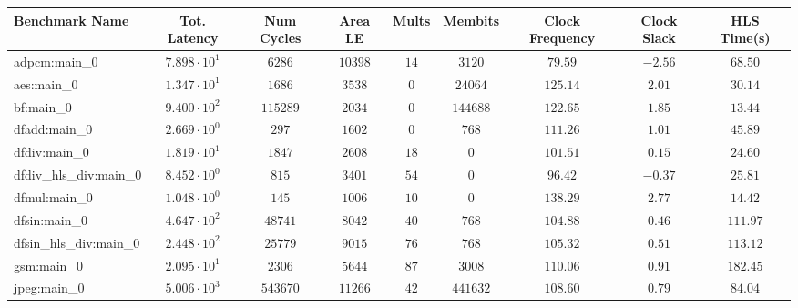 \begin{tabular}{|l|c|c|c|c|c|c|c|c|}
\hline
Benchmark Name          & Tot. Latency           & Num Cycles & Area LE   & Mults   & Membits    & Clock Frequency & Clock Slack & HLS Time(s) \\
\hline
adpcm:main\_0           & $ 7.898 \cdot 10^{1} $ & $ 6286   $ & $ 10398 $ & $ 14  $ & $ 3120   $ & $ 79.59       $ & $ -2.56   $ & $ 68.50   $ \\
aes:main\_0             & $ 1.347 \cdot 10^{1} $ & $ 1686   $ & $ 3538  $ & $ 0   $ & $ 24064  $ & $ 125.14      $ & $ 2.01    $ & $ 30.14   $ \\
bf:main\_0              & $ 9.400 \cdot 10^{2} $ & $ 115289 $ & $ 2034  $ & $ 0   $ & $ 144688 $ & $ 122.65      $ & $ 1.85    $ & $ 13.44   $ \\
dfadd:main\_0           & $ 2.669 \cdot 10^{0} $ & $ 297    $ & $ 1602  $ & $ 0   $ & $ 768    $ & $ 111.26      $ & $ 1.01    $ & $ 45.89   $ \\
dfdiv:main\_0           & $ 1.819 \cdot 10^{1} $ & $ 1847   $ & $ 2608  $ & $ 18  $ & $ 0      $ & $ 101.51      $ & $ 0.15    $ & $ 24.60   $ \\
dfdiv\_hls\_div:main\_0 & $ 8.452 \cdot 10^{0} $ & $ 815    $ & $ 3401  $ & $ 54  $ & $ 0      $ & $ 96.42       $ & $ -0.37   $ & $ 25.81   $ \\
dfmul:main\_0           & $ 1.048 \cdot 10^{0} $ & $ 145    $ & $ 1006  $ & $ 10  $ & $ 0      $ & $ 138.29      $ & $ 2.77    $ & $ 14.42   $ \\
dfsin:main\_0           & $ 4.647 \cdot 10^{2} $ & $ 48741  $ & $ 8042  $ & $ 40  $ & $ 768    $ & $ 104.88      $ & $ 0.46    $ & $ 111.97  $ \\
dfsin\_hls\_div:main\_0 & $ 2.448 \cdot 10^{2} $ & $ 25779  $ & $ 9015  $ & $ 76  $ & $ 768    $ & $ 105.32      $ & $ 0.51    $ & $ 113.12  $ \\
gsm:main\_0             & $ 2.095 \cdot 10^{1} $ & $ 2306   $ & $ 5644  $ & $ 87  $ & $ 3008   $ & $ 110.06      $ & $ 0.91    $ & $ 182.45  $ \\
jpeg:main\_0            & $ 5.006 \cdot 10^{3} $ & $ 543670 $ & $ 11266 $ & $ 42  $ & $ 441632 $ & $ 108.60      $ & $ 0.79    $ & $ 84.04   $ \\

\end{tabular}

